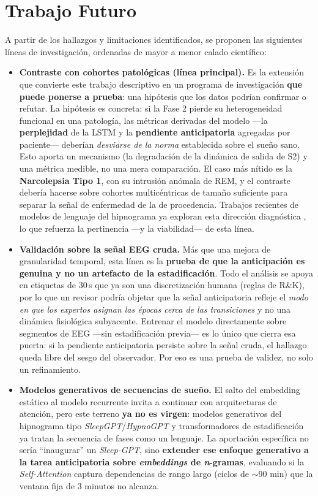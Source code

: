 \section{Trabajo Futuro}

A partir de los hallazgos y limitaciones identificados, se proponen las siguientes líneas de investigación, ordenadas de mayor a menor calado científico:

\begin{itemize}
    \item \textbf{Contraste con cohortes patológicas (línea principal).} Es la extensión que convierte este trabajo descriptivo en un programa de investigación \textbf{que puede ponerse a prueba}: una hipótesis que los datos podrían confirmar o refutar. La hipótesis es concreta: si la Fase 2 pierde su heterogeneidad funcional en una patología, las métricas derivadas del modelo ---la \textbf{perplejidad} de la LSTM y la \textbf{pendiente anticipatoria} agregadas por paciente--- deberían \textit{desviarse de la norma} establecida sobre el sueño sano. Esto aporta un mecanismo (la degradación de la dinámica de salida de S2) y una métrica medible, no una mera comparación. El caso más nítido es la \textbf{Narcolepsia Tipo 1}, con su intrusión anómala de REM, y el contraste debería hacerse sobre cohortes multicéntricas de tamaño suficiente para separar la señal de enfermedad de la de procedencia. Trabajos recientes de modelos de lenguaje del hipnograma ya exploran esta dirección diagnóstica \citep{yu2024sleepgpt}, lo que refuerza la pertinencia ---y la viabilidad--- de esta línea.

    \item \textbf{Validación sobre la señal EEG cruda.} Más que una mejora de granularidad temporal, esta línea es la \textbf{prueba de que la anticipación es genuina y no un artefacto de la estadificación}. Todo el análisis se apoya en etiquetas de 30\,s que ya son una discretización humana (reglas de R\&K), por lo que un revisor podría objetar que la señal anticipatoria refleje el \textit{modo en que los expertos asignan las épocas cerca de las transiciones} y no una dinámica fisiológica subyacente. Entrenar el modelo directamente sobre segmentos de EEG ---sin estadificación previa--- es lo único que cierra esa puerta: si la pendiente anticipatoria persiste sobre la señal cruda, el hallazgo queda libre del sesgo del observador. Por eso es una prueba de validez, no solo un refinamiento.

    \item \textbf{Modelos generativos de secuencias de sueño.} El salto del embedding estático al modelo recurrente invita a continuar con arquitecturas de atención, pero este terreno \textbf{ya no es virgen}: modelos generativos del hipnograma tipo \textit{SleepGPT}/\textit{HypnoGPT} \citep{yu2024sleepgpt} y transformadores de estadificación \citep{phan2022sleeptransformer} ya tratan la secuencia de fases como un lenguaje. La aportación específica no sería ``inaugurar'' un \textit{Sleep-GPT}, sino \textbf{extender ese enfoque generativo a la tarea anticipatoria sobre \textit{embeddings} de \textit{n}-gramas}, evaluando si la \textit{Self-Attention} captura dependencias de rango largo (ciclos de $\sim$90 min) que la ventana fija de 3 minutos no alcanza.


\end{itemize}
